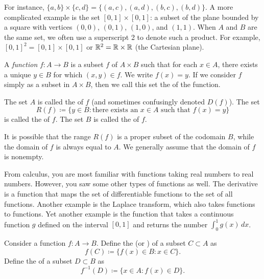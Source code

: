 For instance, $\{ a,b \} \times \{ c , d\} =
\bigl\{
(a,c), (a,d), (b,c), (b,d)
\bigr\}$.
A more complicated example is the set $[0,1] \times [0,1]$: a subset of the
plane bounded by a square with vertices $(0,0)$, $(0,1)$, $(1,0)$, and $(1,1)$.
When $A$ and $B$ are the same set, we often use a superscript 2 to denote
such a product.  For example, $[0,1]^2 = 
[0,1] \times [0,1]$ or ${\mathbb{R}}^2 = {\mathbb{R}} \times {\mathbb{R}}$ (the Cartesian plane).

\begin{defn}
A \emph{function} $f \colon A \to B$ is a subset $f$ of $A \times B$
such that for each $x \in A$, there exists a unique $y \in B$ for which $(x,y) \in f$.
We write $f(x) = y$.
If we consider $f$ simply as a subset in $A \times B$,
then we call this set the
\emph{} of the function.

The set $A$ is called the \emph{} of $f$ (and
sometimes confusingly denoted $D(f)$).  The set
\begin{equation*}
R(f) \coloneqq \{ y \in B : \text{there exists an } x \in A \text{ such that }
f(x)=y \}
\end{equation*}
is called the \emph{} of $f$.
The set $B$ is called the \emph{} of $f$.
\end{defn}

It is possible that the range $R(f)$ is a proper subset of the codomain $B$,
while the domain of $f$ is always equal to $A$.  We generally 
assume that the domain of $f$ is nonempty.

\begin{example}
From calculus, you are most familiar with functions taking real numbers to real
numbers.  However, you saw some other types of functions as well.
The derivative is a function that maps the set of
differentiable functions to the set of all functions.
Another example is the Laplace transform, which also
takes functions to functions.  Yet another example is the function that takes
a continuous function $g$ defined on the interval $[0,1]$ and returns the
number $\int_0^1 g(x) \,dx$.
\end{example}

\begin{defn}
Consider a function $f \colon A \to B$.  Define
the \emph{} (or \emph{}) of a subset
$C \subset A$ as
\begin{equation*}
f(C) \coloneqq \bigl\{ f(x) \in B : x \in C \bigr\} .
\end{equation*}
Define the \emph{} of a subset $D
\subset B$ as
\begin{equation*}
f^{-1}(D) \coloneqq \bigl\{ x \in A : f(x) \in D \bigr\} .
\end{equation*}
\end{defn}

